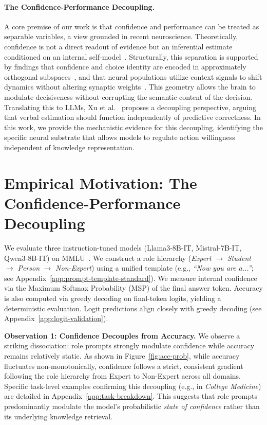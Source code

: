 \documentclass{article}
\begin{document}
\paragraph{The Confidence-Performance Decoupling.} 
A core premise of our work is that confidence and performance can be treated as separable variables, a view grounded in recent neuroscience. Theoretically, confidence is not a direct readout of evidence but an inferential estimate conditioned on an internal self-model~\cite{paper7_metacognition}. Structurally, this separation is supported by findings that confidence and choice identity are encoded in approximately orthogonal subspaces~\cite{paper2_neural_basis}, and that neural populations utilize context signals to shift dynamics without altering synaptic weights~\cite{paper6_context}. This geometry allows the brain to modulate decisiveness without corrupting the semantic content of the decision. Translating this to LLMs, Xu et al.~\cite{paper8_mirror_human} proposes a decoupling perspective, arguing that verbal estimation should function independently of predictive correctness. In this work, we provide the mechanistic evidence for this decoupling, identifying the specific neural substrate that allows models to regulate action willingness independent of knowledge representation.

\section{Empirical Motivation: The Confidence-Performance Decoupling}
\label{sec:motivation}
We evaluate three instruction-tuned models (Llama3-8B-IT, Mistral-7B-IT, Qwen3-8B-IT) on MMLU~\cite{mmlu}. We construct a role hierarchy (\emph{Expert} $\to$ \emph{Student} $\to$ \emph{Person} $\to$ \emph{Non-Expert}) using a unified template (e.g., \emph{``Now you are a...''}; see Appendix~\ref{app:prompt-template-standard}). We measure internal confidence via the Maximum Softmax Probability (MSP) of the final answer token. Accuracy is also computed via greedy decoding on final-token logits, yielding a deterministic evaluation. Logit predictions align closely with greedy decoding (see Appendix~\ref{app:logit-validation}).

\textbf{Observation 1: Confidence Decouples from Accuracy.} 
We observe a striking dissociation: role prompts strongly modulate confidence while accuracy remains relatively static. As shown in Figure~\ref{fig:acc-prob}, while accuracy fluctuates non-monotonically, confidence follows a strict, consistent gradient following the role hierarchy from Expert to Non-Expert across all domains. Specific task-level examples confirming this decoupling (e.g., in \emph{College Medicine}) are detailed in Appendix~\ref{app:task-breakdown}. This suggests that role prompts predominantly modulate the model’s probabilistic \emph{state of confidence} rather than its underlying knowledge retrieval.
\end{document}

